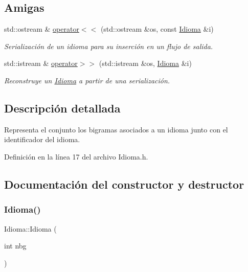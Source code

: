 \subsection*{Amigas}
\begin{DoxyCompactItemize}
\item 
std\+::ostream \& \hyperlink{classIdioma_a0b5cc80627118f2e81ba4a598b049038}{operator$<$$<$} (std\+::ostream \&os, const \hyperlink{classIdioma}{Idioma} \&i)
\begin{DoxyCompactList}\small\item\em Serialización de un idioma para su inserción en un flujo de salida. \end{DoxyCompactList}\item 
std\+::istream \& \hyperlink{classIdioma_ad6842fe05d68733701bf98f04b439e8a}{operator$>$$>$} (std\+::istream \&os, \hyperlink{classIdioma}{Idioma} \&i)
\begin{DoxyCompactList}\small\item\em Reconstruye un \hyperlink{classIdioma}{Idioma} a partir de una serialización. \end{DoxyCompactList}\end{DoxyCompactItemize}


\subsection{Descripción detallada}
Representa el conjunto los bigramas asociados a un idioma junto con el identificador del idioma. 

Definición en la línea 17 del archivo Idioma.\+h.



\subsection{Documentación del constructor y destructor}
\mbox{\label{classIdioma_aa6efbcb93b1c9138c22f5754da90d3c0}} 
\subsubsection{\texorpdfstring{Idioma()}{Idioma()}\hspace{0.1cm}{\footnotesize\ttfamily [1/2]}}
{\footnotesize\ttfamily Idioma\+::\+Idioma (\begin{DoxyParamCaption}\item[{int}]{nbg }\end{DoxyParamCaption})}



